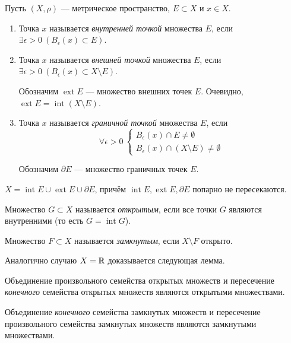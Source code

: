 \begin{definition}
    Пусть $(X, \rho)$ --- метрическое пространство, $E \subset X$ и $x \in X$.

    \begin{enumerate}
        \item Точка $x$ называется \emph{внутренней точкой} множества $E$, если $\exists \epsilon > 0 \ (B_\epsilon(x) \subset E)$.
        \item Точка $x$ называется \emph{внешней точкой} множества $E$, если $\exists \epsilon > 0 \ (B_\epsilon(x) \subset X \setminus E)$.

            Обозначим $\operatorname{ext} E$ --- множество внешних точек $E$. Очевидно, $\operatorname{ext} E = \operatorname{int} (X \setminus E)$.

        \item Точка $x$ называется \emph{граничной точкой} множества $E$, если
            \[
                \forall \epsilon > 0 \ \left\{\begin{array}{l}B_\epsilon (x) \cap E \neq \emptyset \\ B_\epsilon (x) \cap (X \setminus E) \neq \emptyset\end{array}\right.
            \]

            Обозначим $\partial E$ --- множество граничных точек $E$.
    \end{enumerate}
\end{definition}

\begin{note}
    $X = \operatorname{int} E \cup \operatorname{ext} E \cup \partial E$, причём $\operatorname{int} E, \operatorname{ext} E, \partial E$ попарно не пересекаются.
\end{note}

\begin{definition}
    Множество $G \subset X$ называется \emph{открытым}, если все точки $G$ являются внутренними (то есть $G = \operatorname{int} G$).

    Множество $F \subset X$ называется \emph{замкнутым}, если $X \setminus F$ открыто.
\end{definition}

Аналогично случаю $X = \mathbb{R}$ доказывается следующая лемма.
\begin{lemma}
    Объединение произвольного семейства открытых множеств и пересечение \emph{конечного} семейства открытых множеств являются открытыми множествами.

    Объединение \emph{конечного} семейства замкнутых множеств и пересечение произвольного семейства замкнутых множеств являются замкнутыми множествами.
\end{lemma}

